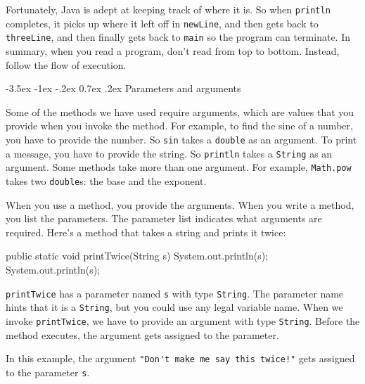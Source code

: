 \documentclass[12pt]{book}
\makeatletter
\renewcommand{\section}{\@startsection {section}{1}{\z@}%
    {-3.5ex \@plus -1ex \@minus -.2ex}%
    {0.7ex \@plus.2ex}%
    {\normalfont\Large\bfseries}}
\theoremstyle{exercise}
\newcommand{\java}[1]{\lstinline{#1}} %
\makeatother
\begin{document}
Fortunately, Java is adept at keeping track of where it is.
So when \java{println} completes, it picks up where it left off in \java{newLine}, and then gets back to \java{threeLine}, and then finally gets back to \java{main} so the program can terminate.
In summary, when you read a program, don't read from top to bottom.
Instead, follow the flow of execution.



\section{Parameters and arguments}


Some of the methods we have used require arguments, which are values that you provide when you invoke the method.
For example, to find the sine of a number, you have to provide the number.
So \java{sin} takes a \java{double} as an argument.
To print a message, you have to provide the string.
So \java{println} takes a \java{String} as an argument.
Some methods take more than one argument.
For example, \java{Math.pow} takes two \java{double}s: the base and the exponent.

When you use a method, you provide the arguments.
When you write a method, you list the parameters.
The parameter list indicates what arguments are required.
Here's a method that takes a string and prints it twice:

\begin{code}
    public static void printTwice(String s) {
        System.out.println(s);
        System.out.println(s);
    }
\end{code}

\java{printTwice} has a parameter named \java{s} with type \java{String}.
The parameter name hints that it is a \java{String}, but you could use any legal variable name.
When we invoke \java{printTwice}, we have to provide an argument with type \java{String}.
Before the method executes, the argument gets assigned to the parameter.

In this example, the argument \java{"Don't make me say this twice!"} gets assigned to the parameter \java{s}.
\end{document}
